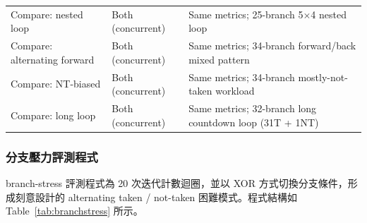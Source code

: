 \documentclass[12pt,a4paper]{article}
\begin{document}
\begin{table}[htbp]
\begin{tabularx}{\linewidth}{lYY}
			Compare: nested loop
			                   & Both (concurrent)
			                   & Same metrics; 25-branch 5$\times$4 nested loop                                                 \\[2pt]
			Compare: alternating forward
			                   & Both (concurrent)
			                   & Same metrics; 34-branch forward/back mixed pattern                                             \\[2pt]
			Compare: NT-biased
			                   & Both (concurrent)
			                   & Same metrics; 34-branch mostly-not-taken workload                                              \\[2pt]
			Compare: long loop
			                   & Both (concurrent)
			                   & Same metrics; 32-branch long countdown loop (31T + 1NT)                                        \\
			\bottomrule
		\end{tabularx}
	\end{table}

	\subsubsection{分支壓力評測程式}

	branch-stress 評測程式為 20 次迭代計數迴圈，並以 XOR 方式切換分支條件，形成刻意設計的 alternating taken / not-taken 困難模式。程式結構如 Table~\ref{tab:branchstress} 所示。
\end{document}
